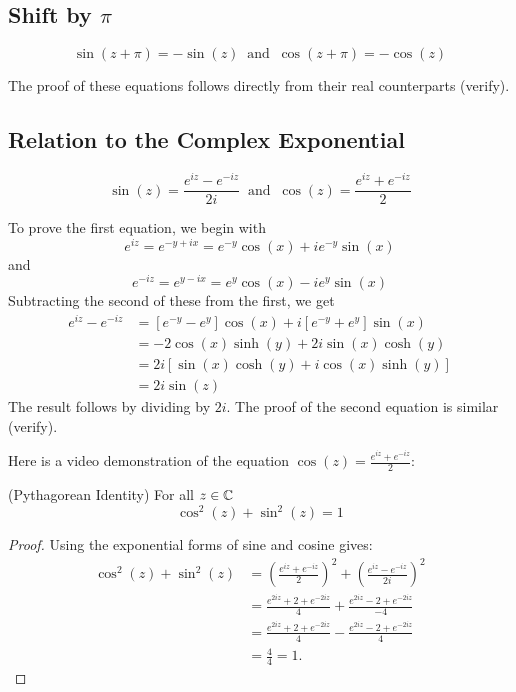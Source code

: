 \documentclass[handout]{ximera}
\begin{document}
\subsection{Shift by $\pi$}
\begin{proposition}
\[
\sin(z + \pi) = -\sin(z) \;\; \mbox{and} \;\; \cos(z+\pi) = -\cos(z)
\]
\end{proposition}
The proof of these equations follows directly from their real counterparts (verify).

\subsection{Relation to the Complex Exponential}
\begin{proposition}
\[
\sin(z) = \frac{e^{iz} - e^{-iz}}{2i} \;\; \mbox{and} \;\;  \cos(z) = \frac{e^{iz} + e^{-iz}}{2}
\]
\end{proposition}
To prove the first equation, we begin with
\[
e^{iz} = e^{-y+ix} = e^{-y}\cos(x) + ie^{-y}\sin(x)
\]
and
\[
e^{-iz} = e^{y-ix} = e^{y}\cos(x) - ie^{y}\sin(x)
\]
Subtracting the second of these from the first, we get
\begin{align*}
e^{iz} - e^{-iz} &= \left[e^{-y}-e^y\right]\cos(x) + i\left[e^{-y}+e^y\right]\sin(x)\\
&=-2\cos(x) \sinh(y) +2i \sin(x)\cosh(y)\\
& = 2i\left[\sin(x)\cosh(y) + i \cos(x)\sinh(y)\right]\\
&=2i\sin(z)
\end{align*}
The result follows by dividing by $2i$.
The proof of the second equation is similar (verify).

Here is a video demonstration of the equation $\cos(z) = \frac{e^{iz}+e^{-iz}}{2}$:\\
\begin{foldable}
\end{foldable}

\begin{corollary}(Pythagorean Identity)
  For all $z \in \mathbb C$
  \[\cos^2(z) + \sin^2(z) = 1\]
  
\end{corollary}
\begin{proof}
  Using the exponential forms of sine and cosine gives:
  \begin{align*}
    \cos^2(z) + \sin^2(z) &= \left(\frac{e^{iz} + e^{-iz}}{2}\right)^2 + \left(\frac{e^{iz} - e^{-iz}}{2i}  \right)^2\\
                         &= \frac{e^{2iz} + 2 + e^{-2iz}}{4} + \frac{e^{2iz} - 2 + e^{-2iz}}{-4}\\
                         &= \frac{e^{2iz} + 2 + e^{-2iz}}{4} - \frac{e^{2iz} - 2 + e^{-2iz}}{4}\\
                         &= \frac44 = 1.                
  \end{align*}
\end{proof}
\end{document}
